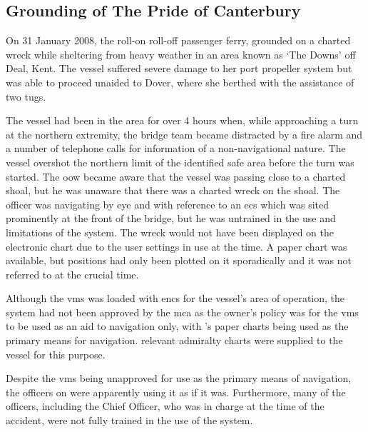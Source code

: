 \subsection{Grounding of The Pride of Canterbury} \label{bkm:incacc:canterbury}
On 31 January 2008, the roll-on roll-off passenger ferry,  grounded on a charted wreck while sheltering from heavy weather in an area known as `The Downs' off Deal, Kent. The vessel suffered severe damage to her port propeller system but was able to proceed unaided to Dover, where she berthed with the assistance of two tugs.

The vessel had been in the area for over 4 hours when, while approaching a turn at the northern extremity, the bridge team became distracted by a fire alarm and a number of telephone calls for information of a non-navigational nature. The vessel overshot the northern limit of the identified safe area before the turn was started. The \gls{oow} became aware that the vessel was passing close to a charted shoal, but he was unaware that there was a charted wreck on the shoal. The officer was navigating by eye and with reference to an \gls{ecs} which was sited prominently at the front of the bridge, but he was untrained in the use and limitations of the system. The wreck would not have been displayed on the electronic chart due to the user settings in use at the time. A paper chart was available, but positions had only been plotted on it sporadically and it was not referred to at the crucial time.

Although the \gls{vms} was loaded with \glspl{enc} for the vessel's area of operation, the system had not been approved by the \gls{mca} as the owner's policy was for the \gls{vms} to be used as an aid to navigation only, with 's paper charts being used as the primary means for navigation. relevant admiralty charts were supplied to the vessel for this purpose.

Despite the \gls{vms} being unapproved for use as the primary means of navigation, the officers on  were apparently using it as if it was. Furthermore, many of the officers, including the Chief Officer, who was in charge at the time of the accident, were not fully trained in the use of the system.

